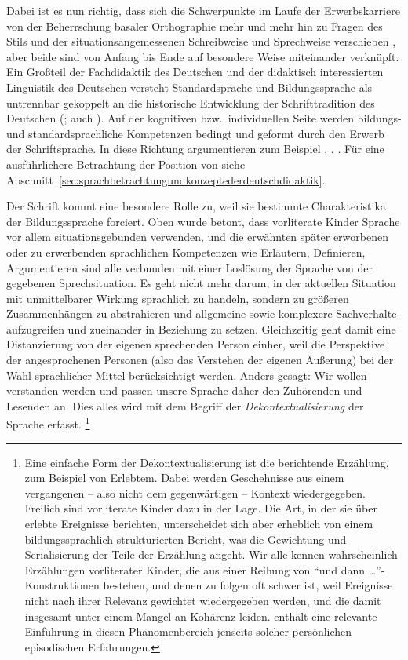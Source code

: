 Dabei ist es nun richtig, dass sich die Schwerpunkte im Laufe der Erwerbskarriere von der Beherrschung basaler Orthographie mehr und mehr hin zu Fragen des Stils und der situationsangemessenen Schreibweise und Sprechweise verschieben \citep[77]{Portmanntselikas2011}, aber beide sind von Anfang bis Ende auf besondere Weise miteinander verknüpft.
Ein Großteil der Fachdidaktik des Deutschen und der didaktisch interessierten Linguistik des Deutschen versteht Standardsprache und Bildungssprache als untrennbar gekoppelt an die historische Entwicklung der Schrifttradition des Deutschen (\citealt[130--150]{Bredel2013}; auch \citealt{Nerius2007}).
Auf der kognitiven bzw.\ individuellen Seite werden bildungs- und standardsprachliche Kompetenzen bedingt und geformt durch den Erwerb der Schriftsprache.
In diese Richtung argumentieren zum Beispiel \citet[4,12,14,15]{Eisenberg2004}, \citet[71,78]{Portmanntselikas2011}, \citet[6]{Feilke2012}.
Für eine ausführlichere Betrachtung der Position von \citet{Bredel2013} siehe Abschnitt~\ref{sec:sprachbetrachtungundkonzeptederdeutschdidaktik}.

Der Schrift kommt eine besondere Rolle zu, weil sie bestimmte Charakteristika der Bildungssprache forciert.
Oben wurde betont, dass vorliterate Kinder Sprache vor allem situationsgebunden verwenden, und die erwähnten später erworbenen oder zu erwerbenden sprachlichen Kompetenzen wie Erläutern, Definieren, Argumentieren sind alle verbunden mit einer Loslösung der Sprache von der gegebenen Sprechsituation.
Es geht nicht mehr darum, in der aktuellen Situation mit unmittelbarer Wirkung sprachlich zu handeln, sondern zu größeren Zusammenhängen zu abstrahieren und allgemeine sowie komplexere Sachverhalte aufzugreifen und zueinander in Beziehung zu setzen.
Gleichzeitig geht damit eine Distanzierung von der eigenen sprechenden Person einher, weil die Perspektive der angesprochenen Personen (also das Verstehen der eigenen Äußerung) bei der Wahl sprachlicher Mittel berücksichtigt werden.
Anders gesagt:
Wir wollen verstanden werden und passen unsere Sprache daher den Zuhörenden und Lesenden an.
Dies alles wird mit dem Begriff der \textit{Dekontextualisierung} der Sprache erfasst.%
\footnote{Eine einfache Form der Dekontextualisierung ist die berichtende Erzählung, zum Beispiel von Erlebtem.
Dabei werden Geschehnisse aus einem vergangenen -- also nicht dem gegenwärtigen -- Kontext wiedergegeben.
Freilich sind vorliterate Kinder dazu in der Lage.
Die Art, in der sie über erlebte Ereignisse berichten, unterscheidet sich aber erheblich von einem bildungssprachlich strukturierten Bericht, was die Gewichtung und Serialisierung der Teile der Erzählung angeht.
Wir alle kennen wahrscheinlich Erzählungen vorliterater Kinder, die aus einer Reihung von "`und dann \ldots"'-Konstruktionen bestehen, und denen zu folgen oft schwer ist, weil Ereignisse nicht nach ihrer Relevanz gewichtet wiedergegeben werden, und die damit insgesamt unter einem Mangel an Kohärenz leiden.
\citet{Bredel2013} enthält eine relevante Einführung in diesen Phänomenbereich jenseits solcher persönlichen episodischen Erfahrungen.}


